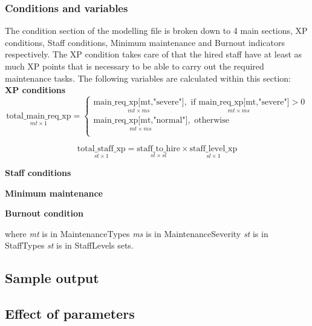         \subsubsection{Conditions and variables}
        The condition section of the modelling file is broken down to 4 main sections, XP conditions,
        Staff conditions, Minimum maintenance and Burnout indicators respectively. The XP condition 
        takes care of that the hired staff have at least as much XP points that is necessary to be able
        to carry out the required maintenance tasks. The following variables are calculated within this
        section:\\
        
        \textbf{XP conditions} \newline
        \begin{equation}
            \underset{mt\times 1}{\mathrm{\text{total\_main\_req\_xp}}} = 
            \begin{cases}
                \underset{mt\times ms}{\text{main\_req\_xp[mt,"severe"]}}, \underset{mt\times ms}{\text{ if } \text{main\_req\_xp[mt,"severe"]}} > 0\\
                \underset{mt\times ms}{\text{main\_req\_xp[mt,"normal"]}}, \text{ otherwise}\\
            \end{cases}
        \end{equation}

        \begin{equation}
            \underset{st\times 1}{\text{total\_staff\_xp}} =  
                \underset{st\times sl}{\text{staff\_to\_hire}}\times \underset{sl\times 1}{\text{staff\_level\_xp}}
        \end{equation}

        \textbf{Staff conditions} \newline

        \textbf{Minimum maintenance} \newline

        \textbf{Burnout condition} \newline


        where \newline
            \indent \textit{mt} is in MaintenanceTypes \newline
            \indent \textit{ms} is in MaintenanceSeverity \newline
            \indent \textit{st} is in StaffTypes \newline
            \indent \textit{st} is in StaffLevels \newline
        sets.


    \subsection{Sample output}


    \subsection{Effect of parameters}